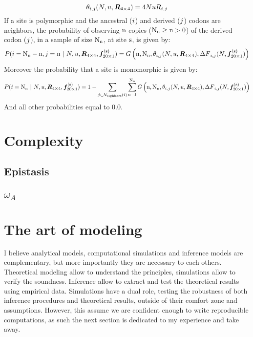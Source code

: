 \begin{equation}
\theta_{{i}, {j}}(N, u, \bm{R}_{4\times4}) = 4 N u R_{{i}, {j}}
\end{equation}
If a site is polymorphic and the ancestral (${i}$) and derived (${j}$) codons are neighbors, the probability of observing $\text{n}$ copies ($\text{N}_{\text{n}} \geq \text{n} > 0$) of the derived codon (${j}$), in a sample of size $\text{N}_{\text{n}}$, at site $\text{s}$, is given by:
\begin{equation}
P({i}=\text{N}_{\text{n}}-\text{n},{j}=\text{n} \ |\ N, u, \bm{R}_{4\times4}, \bm{f}_{20\times1}^{(\text{s})})  =  G\left(\text{n}, \text{N}_{\text{n}}, \theta_{{i}, {j}}(N, u, \bm{R}_{4\times4}), {\Delta F}_{{i}, {j}}(N, \bm{f}_{20\times1}^{(\text{s})}) \right)
\end{equation}
Moreover the probability that a site is monomorphic is given by:
\begin{equation}
P(\ci= \samples \ |\ \Ne, u, \Mutmatrix, \Fit\siteexp)  = 1 - \sum_{\cj \in \Ni} \sum_{\copies=1}^{\samples}  G\left(\copies, \samples, \theta_{\itoj}(\Ne, u, \Mutmatrix),  \scaledselcoef_{\itoj}(\Ne, \Fit\siteexp)\right)
\end{equation}
And all other probabilities equal to $0.0$.


\section{Complexity}

\subsection{Epistasis}

\subsection{$\omega_A$}


\section{The art of modeling}
I believe analytical models, computational simulations and inference models are complementary, but more importantly they are necessary to each others. 
Theoretical modeling allow to understand the principles, simulations allow to verify the soundness.
Inference allow to extract and test the theoretical results using empirical data.
Simulations have a dual role, testing the robustness of both inference procedures and theoretical results, outside of their comfort zone and assumptions.
However, this assume we are confident enough to write reproducible computations, as such the next section is dedicated to my experience and take away.

